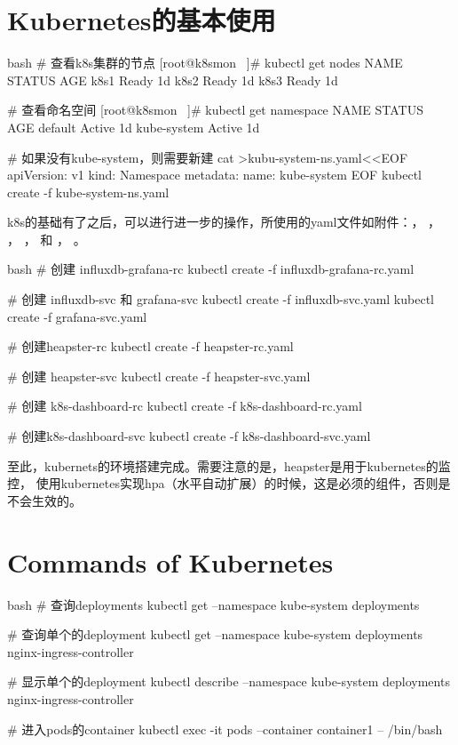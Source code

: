 \section{Kubernetes的基本使用}
\begin{code-block}{bash}
# 查看k8s集群的节点
[root@k8smon ~]# kubectl get nodes
NAME      STATUS    AGE
k8s1      Ready     1d
k8s2      Ready     1d
k8s3      Ready     1d

# 查看命名空间
[root@k8smon ~]# kubectl get namespace
NAME          STATUS    AGE
default       Active    1d
kube-system   Active    1d

# 如果没有kube-system，则需要新建
cat >kubu-system-ns.yaml<<EOF
apiVersion: v1
kind: Namespace
metadata:
  name: kube-system
EOF
kubectl create -f kube-system-ns.yaml
\end{code-block}

k8s的基础有了之后，可以进行进一步的操作，所使用的yaml文件如附件：，
，
，
，
和
，
。
\label{heapster}
\begin{code-block}{bash}
# 创建 influxdb-grafana-rc
kubectl create -f influxdb-grafana-rc.yaml

# 创建 influxdb-svc 和 grafana-svc
kubectl create -f influxdb-svc.yaml
kubectl create -f grafana-svc.yaml

# 创建heapster-rc
kubectl create -f heapster-rc.yaml

# 创建 heapster-svc
kubectl create -f heapster-svc.yaml

# 创建 k8s-dashboard-rc
kubectl create -f k8s-dashboard-rc.yaml

# 创建k8s-dashboard-svc
kubectl create -f k8s-dashboard-svc.yaml
\end{code-block}

至此，kubernets的环境搭建完成。需要注意的是，heapster是用于kubernetes的监控，
使用kubernetes实现hpa（水平自动扩展）的时候，这是必须的组件，否则是不会生效的。

\section{Commands of Kubernetes}
\begin{code-block}{bash}
# 查询deployments
kubectl get --namespace kube-system deployments

# 查询单个的deployment
kubectl get --namespace kube-system deployments nginx-ingress-controller

# 显示单个的deployment
kubectl describe --namespace kube-system deployments nginx-ingress-controller

# 进入pods的container
kubectl exec -it pods --container container1 -- /bin/bash

\end{code-block}


